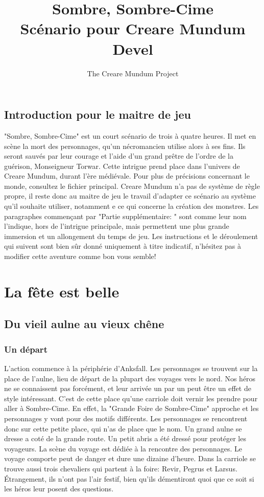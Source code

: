 \documentclass{book}
\title{Sombre, Sombre-Cime \\ Scénario pour Creare Mundum \\ Devel}
\author{The Creare Mundum Project}
\date{\oldstylenums{\insertdate}}
\begin{document}
\maketitle
\setcounter{tocdepth}{2} %
\renewcommand{\contentsname}{Sommaire} 
\tableofcontents

\section{Introduction pour le maitre de jeu}
"Sombre, Sombre-Cime" est un court scénario de trois à quatre heures. Il met en scène la mort des personnages, qu'un nécromancien utilise alors à ses fins. Ils seront sauvés par leur courage et l'aide d'un grand prêtre de l'ordre de la guérison, Monseigneur Torwar.
Cette intrigue prend place dans l'univers de Creare Mundum, durant l'ère médiévale. Pour plus de précisions concernant le monde, consultez le fichier principal.
\newline
Creare Mundum n'a pas de système de règle propre, il reste donc au maitre de jeu le travail d'adapter ce scénario au système qu'il souhaite utiliser, notamment e ce qui concerne la création des monstres.
\newline
Les paragraphes commençant par "Partie supplémentaire: " sont comme leur nom l'indique, hors de l'intrigue principale, mais permettent une plus grande immersion et un allongement du temps de jeu.
\newline
Les instructions et le déroulement qui suivent sont bien sûr donné uniquement à titre indicatif, n'hésitez pas à modifier cette aventure comme bon vous semble!
\chapter{La fête est belle}
\section{Du vieil aulne au vieux chêne}
\subsection{Un départ}
L'action commence à la périphérie d'Anksfall. Les personnages se trouvent sur la place de l’aulne, lieu de départ de la plupart des voyages vers le nord. Nos héros ne se connaissent pas forcément, et leur arrivée un par un peut être un effet de style intéressant. C'est de cette place qu'une carriole doit vernir les prendre pour aller à Sombre-Cime. En effet, la "Grande Foire de Sombre-Cime" approche et les personnages y vont pour des motifs différents. Les personnages  se rencontrent donc sur cette petite place, qui n'as de place que le nom. Un grand aulne se dresse a coté de la grande route. Un petit abris a été dressé pour protéger les voyageurs. La scène du voyage est dédiée à la rencontre des personnages. Le voyage comporte peut de danger et dure une dizaine d'heure. Dans la carriole se trouve aussi trois chevaliers qui partent à la foire: Revir, Pegrus et Larsus. Étrangement, ils n'ont pas l'air festif, bien qu'ils démentiront quoi que ce soit si les héros leur posent des questions.
\end{document}
